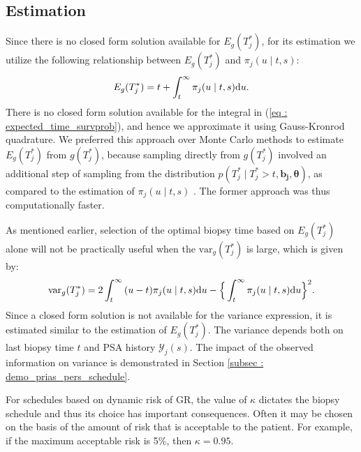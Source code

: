 
\subsection{Estimation}
Since there is no closed form solution available for $E_g(T^*_j)$, for its estimation we utilize the following relationship between $E_g(T^*_j)$ and $\pi_j(u \mid t, s)$:
\begin{equation}
\label{eq : expected_time_survprob}
E_g(T^*_j) = t + \int_t^\infty \pi_j(u \mid t, s) \rmn{d} u.
\end{equation}
There is no closed form solution available for the integral in (\ref{eq : expected_time_survprob}), and hence we approximate it using Gauss-Kronrod quadrature. We preferred this approach over Monte Carlo methods to estimate $E_g(T^*_j)$ from $g(T^*_j)$, because sampling directly from $g(T^*_j)$ involved an additional step of sampling from the distribution $p(T^*_j \mid T^*_j > t, \boldsymbol{b_j}, \boldsymbol{\theta})$, as compared to the estimation of $\pi_j(u \mid t, s)$ \citep{rizopoulos2011dynamic}. The former approach was thus computationally faster. 

As mentioned earlier, selection of the optimal biopsy time based on $E_g(T_j^*)$ alone will not be practically useful when the $\mbox{var}_g(T^*_j)$ is large, which is given by:
\begin{equation}
\label{eq : var_time_survprob}
\mbox{var}_g(T^*_j) = 2 \int_t^\infty {(u-t) \pi_j(u \mid t, s) \rmn{d} u} - \Big\{\int_t^\infty \pi_j(u \mid t, s) \rmn{d} u\Big\}^2.
\end{equation}
Since a closed form solution is not available for the variance expression, it is estimated similar to the estimation of $E_g(T^*_j)$. The variance depends both on last biopsy time $t$ and PSA history $\mathcal{Y}_j(s)$. The impact of the observed information on variance is demonstrated in Section \ref{subsec : demo_prias_pers_schedule}.

For schedules based on dynamic risk of GR, the value of $\kappa$ dictates the biopsy schedule and thus its choice has important consequences. Often it may be chosen on the basis of the amount of risk that is acceptable to the patient. For example, if the maximum acceptable risk is 5\%, then $\kappa = 0.95$.

